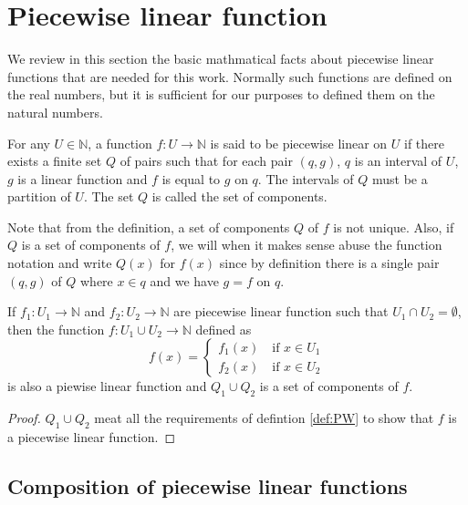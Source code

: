 
\section{Piecewise linear function}\label{sec:pwl}

We review in this section the basic mathmatical facts about piecewise linear
functions that are needed for this work. Normally such functions are defined on
the real numbers, but it is sufficient for our purposes to defined them on the natural
numbers.

\begin{definition}
  \label{def:PW}
  For any $U \in \mathbb{N}$, a function $f : U \rightarrow \mathbb{N}$ is said
  to be piecewise linear on $U$ if there exists a finite set $Q$ of pairs
  such that for each pair $(q,g)$, $q$ is an interval of $U$, $g$ is a linear
  function and $f$ is equal to $g$ on $q$. The intervals of $Q$ must be a
  partition of $U$. The set $Q$ is called the set of components.
\end{definition}
Note that from the definition, a set of components $Q$ of $f$ is not unique. Also, if
$Q$ is a set of components of $f$, we will when it makes sense abuse the
function notation and write $Q(x)$ for $f(x)$ since by definition there is a
single pair $(q, g)$ of $Q$ where $x \in q$ and we have $g = f$ on $q$. 

\begin{lemma}
  \label{thm:union_pwl}
  If $f_1 : U_1 \rightarrow \mathbb{N}$ and $f_2 : U_2 \rightarrow \mathbb{N}$
  are piecewise linear function such that $U_1 \cap U_2 = \emptyset$, then the
  function $f : U_1 \cup U_2 \rightarrow \mathbb{N}$ defined as
  \begin{equation}
    f(x) = \begin{cases}
      f_1(x) \quad \text{if $x \in U_1$} \\
      f_2(x) \quad \text{if $x \in U_2$} 
    \end{cases}
  \end{equation}
  is also a piewise linear function and $Q_1 \cup Q_2$ is a set of components of $f$.
\end{lemma}
\begin{proof}
  $Q_1 \cup Q_2$ meat all the requirements of defintion \ref{def:PW} to show
  that $f$ is a piecewise linear function.
\end{proof}

\subsection{Composition of piecewise linear functions}


